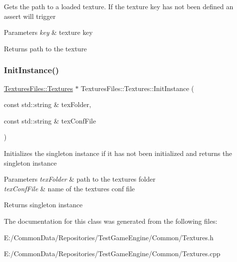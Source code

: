 Gets the path to a loaded texture. If the texture key has not been defined an assert will trigger 
\begin{DoxyParams}{Parameters}
{\em key} & texture key \\
\hline
\end{DoxyParams}
\begin{DoxyReturn}{Returns}
path to the texture 
\end{DoxyReturn}
\mbox{\label{class_textures_files_1_1_textures_a76d7462b113235e27422e143bde5e527}} 
\subsubsection{\texorpdfstring{InitInstance()}{InitInstance()}}
{\footnotesize\ttfamily \mbox{\hyperlink{class_textures_files_1_1_textures}{Textures\+Files\+::\+Textures}} $\ast$ Textures\+Files\+::\+Textures\+::\+Init\+Instance (\begin{DoxyParamCaption}\item[{const std\+::string \&}]{tex\+Folder,  }\item[{const std\+::string \&}]{tex\+Conf\+File }\end{DoxyParamCaption})\hspace{0.3cm}{\ttfamily [static]}}

Initializes the singleton instance if it has not been initialized and returns the singleton instance 
\begin{DoxyParams}{Parameters}
{\em tex\+Folder} & path to the textures folder \\
\hline
{\em tex\+Conf\+File} & name of the textures conf file \\
\hline
\end{DoxyParams}
\begin{DoxyReturn}{Returns}
singleton instance 
\end{DoxyReturn}


The documentation for this class was generated from the following files\+:\begin{DoxyCompactItemize}
\item 
E\+:/\+Common\+Data/\+Repositories/\+Test\+Game\+Engine/\+Common/Textures.\+h\item 
E\+:/\+Common\+Data/\+Repositories/\+Test\+Game\+Engine/\+Common/Textures.\+cpp\end{DoxyCompactItemize}
